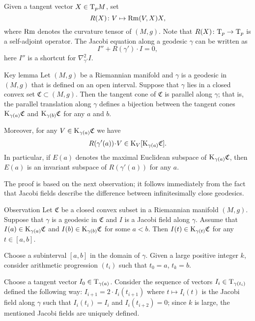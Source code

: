 \documentclass[a4paper,10pt]{article}
\begin{document}
Given a tangent vector $X\in\mathrm{T}_pM$, set
\[R(X)\colon V\mapsto \operatorname{Rm}(V,X)X,\]
where $\operatorname{Rm}$ denotes the curvature tensor of $(M,g)$.
Note that $R(X)\colon\mathrm{T}_p\to \mathrm{T}_p$ is a self-adjoint operator. The Jacobi equation along a geodesic $\gamma$ can be written as 
\[I''+R(\gamma')\cdot I=0,\]
here  $I''$ is a shortcut for $\nabla^2_{\gamma'}I$.
 
\begin{thm}{Key lemma}\label{lem:key}
Let $(M,g)$ be a Riemannian manifold and $\gamma$ is a geodesic in $(M,g)$ that is defined on an open interval.
Suppose that $\gamma$ lies in a closed convex set $\mathfrak{C}\subset (M,g)$.
Then the tangent cone of $\mathfrak{C}$ is parallel along $\gamma$; that is, the parallel translation along $\gamma$ defines a bijection between the tangent cones $\mathrm{K}_{\gamma(a)}\mathfrak{C}$ and $\mathrm{K}_{\gamma(b)}\mathfrak{C}$ for any $a$ and $b$.

Moreover, for any $V\in \mathrm{K}_{\gamma(a)}\mathfrak{C}$ we have
\[R(\gamma'(a))\cdot V\in \K_V[\K_{\gamma(a)}\mathfrak{C}].\]
In particular, if $E(a)$ denotes the maximal Euclidean subspace of $\mathrm{K}_{\gamma(a)}\mathfrak{C}$, then $E(a)$ is an invariant subspace of $R(\gamma'(a))$ for any $a$.
\end{thm}

The proof is based on the next observation;
it follows immediately from the fact that Jacobi fields describe the difference between infinitesimally close geodesics.

\begin{thm}{Observation}
Let  $\mathfrak{C}$ be a closed convex subset in a Riemannian manifold $(M,g)$.
Suppose that $\gamma$ is a geodesic in $\mathfrak{C}$ and $I$ is a Jacobi field along $\gamma$.
Assume that $I(a)\in \mathrm{K}_{\gamma(a)}\mathfrak{C}$ and $I(b)\in \mathrm{K}_{\gamma(b)}\mathfrak{C}$ for some $a<b$.
Then $I(t)\in \mathrm{K}_{\gamma(t)}\mathfrak{C}$ for any $t\in [a,b]$.
\end{thm}

Choose a subinterval $[a,b]$ in the domain of $\gamma$.
Given a large positive integer $k$, consider arithmetic progression
$(t_i)$ such that $t_0=a$, $t_k=b$.

Choose a tangent vector $I_0\in\mathrm{T}_{\gamma(a)}$. 
Consider the sequence of vectors $I_i\z\in\T_{\gamma(t_i)}$ defined the following way: $I_{i+1}=2\cdot I_i(t_{i+1})$ where $t\mapsto I_i(t)$ is the Jacobi field along $\gamma$ such that $I_i(t_i)=I_i$ and $I_i(t_{i+2})=0$;
since $k$ is large, the mentioned Jacobi fields are uniquely defined.
\end{document}
